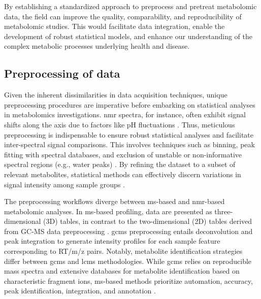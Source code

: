 \documentclass[ENG, BIB]{TFUOC}%
\begin{document}
By establishing a standardized approach to preprocess and pretreat metabolomic data, the field can improve the quality, comparability, and reproducibility of metabolomic studies. This would facilitate data integration, enable the development of robust statistical models, and enhance our understanding of the complex metabolic processes underlying health and disease.


\subsection{Preprocessing of data}

Given the inherent dissimilarities in data acquisition techniques, unique preprocessing procedures are imperative before embarking on statistical analyses in metabolomics investigations. \gls{nmr} spectra, for instance, often exhibit signal shifts along the axis due to factors like pH fluctuations \cite{bhinderwalaChemicalShiftVariations2022}. Thus, meticulous preprocessing is indispensable to ensure robust statistical analyses and facilitate inter-spectral signal comparisons. This involves techniques such as binning, peak fitting with spectral databases, and exclusion of unstable or non-informative spectral regions (e.g., water peaks) \cite{chenGuideMetabolomicsAnalysis2022a,sunPretreatingNormalizingMetabolomics2024,stanstrupMetaRbolomicsToolboxBioconductor2019}. By refining the dataset to a subset of relevant metabolites, statistical methods can effectively discern variations in signal intensity among sample groups \cite{qiuSmallMoleculeMetabolites2023}.


The preprocessing workflows diverge between \gls{ms}-based and \gls{nmr}-based metabolomic analyses. In \gls{ms}-based profiling, data are presented as three-dimensional (3D) tables, in contrast to the two-dimensional (2D) tables derived from GC-MS data preprocessing \cite{sunPretreatingNormalizingMetabolomics2024,stanstrupMetaRbolomicsToolboxBioconductor2019}. \gls{gcms} preprocessing entails deconvolution and peak integration to generate intensity profiles for each sample feature corresponding to {RT/m/z} pairs. Notably, metabolite identification strategies differ between \gls{gcms} and \gls{lcms} methodologies. While \gls{gcms} relies on reproducible mass spectra and extensive databases for metabolite identification based on characteristic fragment ions, \gls{ms}-based methods prioritize automation, accuracy, peak identification, integration, and annotation \cite{xiaoMetaboliteIdentificationQuantitation2012,kiselevaDefiningBloodPlasma2021}.
\end{document}
